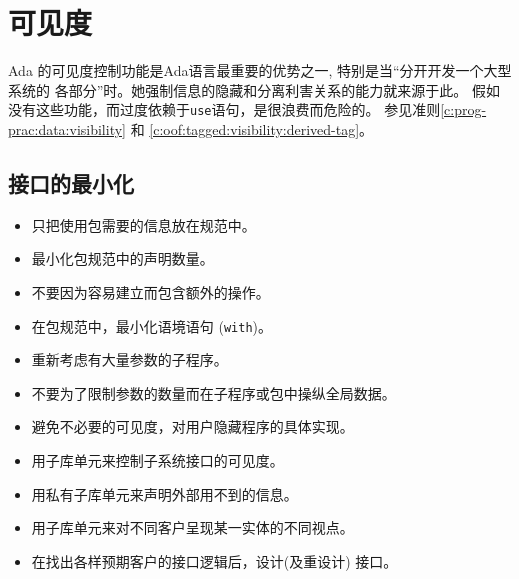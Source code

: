 %
%
%

\section{可见度}
Ada 的可见度控制功能是Ada语言最重要的优势之一, 特别是当``分开开发一个大型系统的
各部分''时。她强制信息的隐藏和分离利害关系的能力就来源于此。
假如没有这些功能，而过度依赖于\texttt{use}语句，是很浪费而危险的。
参见准则\ref{c:prog-prac:data:visibility} 和
 \ref{c:oof:tagged:visibility:derived-tag}。

\subsection{接口的最小化}
\label{prog-struct:visiblity:min-intf}
\begin{itemize}
\item 只把使用包需要的信息放在规范中。
\item 最小化包规范中的声明数量。
\item 不要因为容易建立而包含额外的操作。
\item 在包规范中，最小化语境语句 (\texttt{with})。
\item 重新考虑有大量参数的子程序。
\item 不要为了限制参数的数量而在子程序或包中操纵全局数据。
\item 避免不必要的可见度，对用户隐藏程序的具体实现。
\item 用子库单元来控制子系统接口的可见度。
\item 用私有子库单元来声明外部用不到的信息。
\item 用子库单元来对不同客户呈现某一实体的不同视点。
\item 在找出各样预期客户的接口逻辑后，设计(及重设计) 接口。
\end{itemize}


